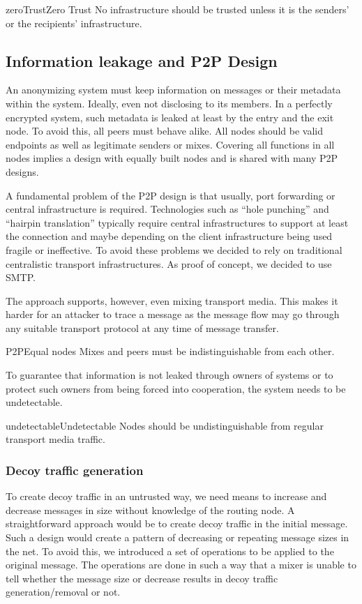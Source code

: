 \begin{requirement}{zeroTrust}{Zero Trust}
	No infrastructure should be trusted unless it is the senders' or the recipients' infrastructure.
\end{requirement}    

\subsection{Information leakage and P2P Design}
An anonymizing system must keep information on messages or their metadata within the system. Ideally, even not disclosing to its members. In a perfectly encrypted system, such metadata is leaked at least by the entry and the exit node. To avoid this, all peers must behave alike. All nodes should be valid endpoints as well as legitimate senders or mixes. Covering all functions in all nodes implies a design with equally built nodes and is shared with many P2P designs.

A fundamental problem of the P2P design is that usually, port forwarding or central infrastructure is required. Technologies such as ``hole punching'' and ``hairpin translation'' typically require central infrastructures to support at least the connection and maybe depending on the client infrastructure being used fragile or ineffective. To avoid these problems we decided to rely on traditional centralistic transport infrastructures. As proof of concept, we decided to use SMTP. 

The approach supports, however, even mixing transport media. This makes it harder for an attacker to trace a message as the message flow may go through any suitable transport protocol at any time of message transfer.

\begin{requirement}{P2P}{Equal nodes}
	Mixes and peers must be indistinguishable from each other. 
\end{requirement}

To guarantee that information is not leaked through owners of systems or to protect such owners from being forced into cooperation, the system needs to be undetectable.
\begin{requirement}{undetectable}{Undetectable}
	Nodes should be undistinguishable from regular transport media traffic. 
\end{requirement}

\subsubsection{Decoy traffic generation}
To create decoy traffic in an untrusted way, we need means to increase and decrease messages in size without knowledge of the routing node. A straightforward approach would be to create decoy traffic in the initial message. Such a design would create a pattern of decreasing or repeating message sizes in the net. To avoid this, we introduced a set of operations to be applied to the original message. The operations are done in such a way that a mixer is unable to tell whether the message size or decrease results in decoy traffic generation/removal or not.

